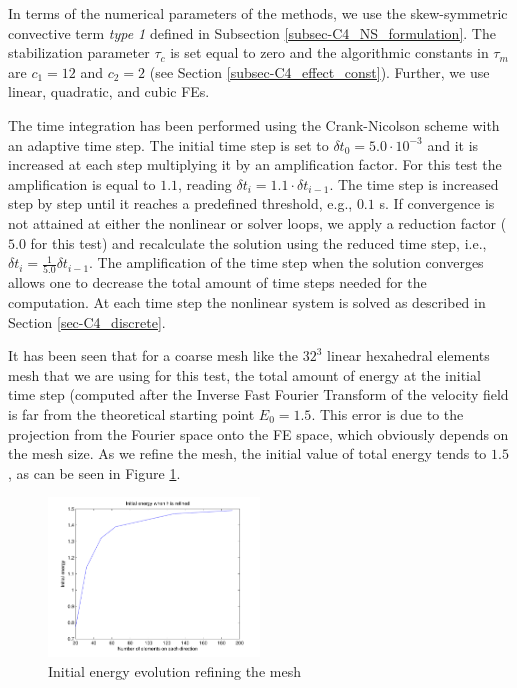 In terms of the numerical parameters of the methods, we use the skew-symmetric convective term \textit{type 1} defined in Subsection \ref{subsec-C4_NS_formulation}. 
The stabilization parameter $\tau_c$ is set equal to zero and the algorithmic constants in $\tau_m$ are $c_1=12$ and $c_2=2$ (see Section \ref{subsec-C4_effect_const}).
Further, we use linear, quadratic, and cubic FEs.

The time integration has been performed using the Crank-Nicolson scheme with an adaptive time step. The initial time step is set to $\delta t_0=5.0\cdot10^{-3}$ and it is increased at each step multiplying it by an amplification factor. For this test the amplification is equal to $1.1$, reading $\delta t_i=1.1\cdot\delta t_{i-1}$. The time step is increased step by step until it reaches a predefined threshold, e.g., $0.1$ s. If convergence is not attained at either the nonlinear or solver loops,  we apply a reduction factor ($5.0$ for this test) and recalculate the solution using the reduced time step, i.e., $\delta t_i=\frac{1}{5.0}\delta t_{i-1}$. The amplification of the time step when the solution converges %
allows one to decrease the total amount of time steps needed for the computation. %
At each time step the nonlinear system is solved as described in Section \ref{sec-C4_discrete}. 

It has been seen that for a coarse mesh like the $32^3$ linear hexahedral elements mesh that we are using for this test, the total amount of energy at the initial time step (computed after the Inverse Fast Fourier Transform of the velocity field is far from the theoretical starting point $E_0=1.5$. This error is due to the projection from the Fourier space onto the FE space, which obviously depends on the mesh size. As we refine the mesh, the initial value of total energy tends to $1.5$, as can be seen in Figure \ref{fig:initial_ene}.
\begin{figure}[h!]
	\centering	
	\includegraphics[width=0.5\textwidth]{Figures/Chapter4/DHIT/Initial_ene}
	\caption{Initial energy evolution refining the mesh}
	\label{fig:initial_ene}
\end{figure}

